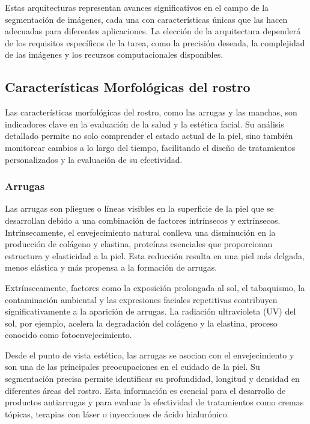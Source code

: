 Estas arquitecturas representan avances significativos en el campo de la segmentación de imágenes, cada una con características únicas que las hacen adecuadas para diferentes aplicaciones. La elección de la arquitectura dependerá de los requisitos específicos de la tarea, como la precisión deseada, la complejidad de las imágenes y los recursos computacionales disponibles.


\subsection{Características Morfológicas del rostro}
Las características morfológicas del rostro, como las arrugas y las manchas, son indicadores clave en la evaluación de la salud y la estética facial. Su análisis detallado permite no solo comprender el estado actual de la piel, sino también monitorear cambios a lo largo del tiempo, facilitando el diseño de tratamientos personalizados y la evaluación de su efectividad. \parencite{makrantonaki2012skin}

\subsubsection{Arrugas}

Las arrugas son pliegues o líneas visibles en la superficie de la piel que se desarrollan debido a una combinación de factores intrínsecos y extrínsecos. Intrínsecamente, el envejecimiento natural conlleva una disminución en la producción de colágeno y elastina, proteínas esenciales que proporcionan estructura y elasticidad a la piel. Esta reducción resulta en una piel más delgada, menos elástica y más propensa a la formación de arrugas. \parencite{autor2021arrugas}

Extrínsecamente, factores como la exposición prolongada al sol, el tabaquismo, la contaminación ambiental y las expresiones faciales repetitivas contribuyen significativamente a la aparición de arrugas. La radiación ultravioleta (UV) del sol, por ejemplo, acelera la degradación del colágeno y la elastina, proceso conocido como fotoenvejecimiento. \parencite{yoon2023}

Desde el punto de vista estético, las arrugas se asocian con el envejecimiento y son una de las principales preocupaciones en el cuidado de la piel. Su segmentación precisa permite identificar su profundidad, longitud y densidad en diferentes áreas del rostro. Esta información es esencial para el desarrollo de productos antiarrugas y para evaluar la efectividad de tratamientos como cremas tópicas, terapias con láser o inyecciones de ácido hialurónico. \parencite{autor2021arrugas}


